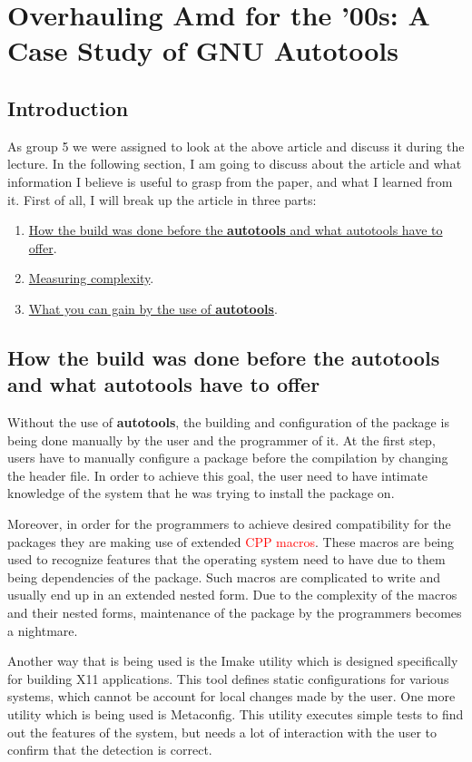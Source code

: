 \documentclass[11pt]{article}
\begin{document}
\newpage
\section{Overhauling Amd for the ’00s: A Case Study of GNU Autotools}
\author{Alexadros Tsiridis}

\subsection{Introduction}

As group 5 we were assigned to look at the above article and discuss it during the lecture. In the following section, I am going to discuss about the article and what information I believe is useful to grasp from the paper, and what I learned from it. First of all, I will break up the article in three parts:
\begin{enumerate}
\item \underline{How the build was done before the \textbf{autotools} and what autotools have to offer}.
\item \underline{Measuring complexity}.
\item \underline{What you can gain by the use of \textbf{autotools}}.
\end{enumerate}

\subsection{How the build was done before the autotools and what autotools have to offer}

Without the use of \textbf{autotools}, the building and configuration of the package is being done manually by the user and the programmer of it. At the first step, users have to manually configure a package before the compilation by changing the header file. In order to achieve this goal, the user need to have intimate knowledge of the system that he was trying to install the package on.

Moreover, in order for the programmers to achieve desired compatibility for the packages they are making use of extended \textcolor{red}{CPP macros}. These macros are being used to recognize features that the operating system need to have due to them being dependencies of the package. Such macros are complicated to write and usually end up in an extended nested form. Due to the complexity of the macros and their nested forms, maintenance of the package by the programmers becomes a nightmare.

Another way that is being used is the Imake utility which is designed specifically for building X11 applications. This tool defines static configurations for various systems, which cannot be account for local changes made by the user. One more utility which is being used is Metaconfig. This utility executes simple tests to find out the features of the system, but needs a lot of interaction with the user to confirm that the detection is correct.
\end{document}
